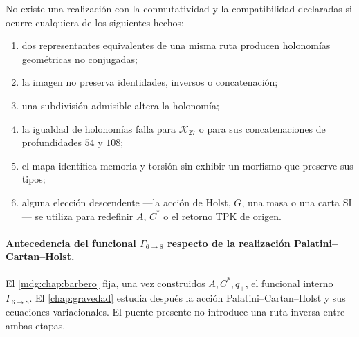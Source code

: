 \begin{criterion}
\label{crit:puente-tpk-cartan}
No existe una realización con la conmutatividad y la compatibilidad declaradas
si ocurre cualquiera de los siguientes hechos:
\begin{enumerate}
 \item dos representantes equivalentes de una misma ruta producen
 holonomías geométricas no conjugadas;
 \item la imagen no preserva identidades, inversos o concatenación;
 \item una subdivisión admisible altera la holonomía;
 \item la igualdad de holonomías falla para \(\mathcal K_{27}\) o para sus
 concatenaciones de profundidades \(54\) y \(108\);
 \item el mapa identifica memoria y torsión sin exhibir un morfismo que
 preserve sus tipos;
 \item alguna elección descendente ---la acción de Holst, \(G\), una masa o
 una carta SI--- se utiliza para redefinir \(A\), \(C^\ast\) o el retorno
 TPK de origen.
\end{enumerate}
\end{criterion}

\paragraph{Antecedencia del funcional \(\Gamma_{6\to8}\) respecto de la realización Palatini--Cartan--Holst.}
El \cref{mdg:chap:barbero} fija, una vez construidos \(A,C^\ast,q_\pm\), el
funcional interno \(\Gamma_{6\to8}\). El \cref{chap:gravedad} estudia después
la acción Palatini--Cartan--Holst y sus ecuaciones variacionales. El puente
presente no introduce una ruta inversa entre ambas etapas.
